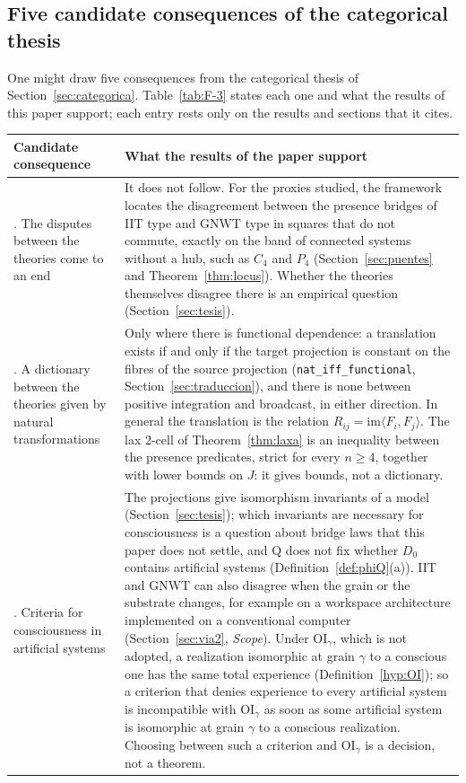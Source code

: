 \clearpage
\subsection{Five candidate consequences of the categorical thesis}\label{sec:consecuencias}
One might draw five consequences from the categorical thesis of Section~\ref{sec:categorica}. Table~\ref{tab:F-3} states each one and what the results of this paper support; each entry rests only on the results and sections that it cites.
\begin{table}[htbp]\centering\small
\begin{tabular}{>{\raggedright\arraybackslash}p{}>{\raggedright\arraybackslash}p{}}
\toprule
Candidate consequence & What the results of the paper support\\
\midrule
1. The disputes between the theories come to an end & It does not follow. For the proxies studied, the framework locates the disagreement between the presence bridges of IIT type and GNWT type in squares that do not commute, exactly on the band of connected systems without a hub, such as $C_4$ and $P_4$ (Section~\ref{sec:puentes} and Theorem~\ref{thm:locus}). Whether the theories themselves disagree there is an empirical question (Section~\ref{sec:tesis}).\\
2. A dictionary between the theories given by natural transformations & Only where there is functional dependence: a translation exists if and only if the target projection is constant on the fibres of the source projection (\texttt{nat\_iff\_functional}, Section~\ref{sec:traduccion}), and there is none between positive integration and broadcast, in either direction. In general the translation is the relation $R_{ij}=\mathrm{im}\langle F_i,F_j\rangle$. The lax 2-cell of Theorem~\ref{thm:laxa} is an inequality between the presence predicates, strict for every $n\ge4$, together with lower bounds on $J$: it gives bounds, not a dictionary.\\
3. Criteria for consciousness in artificial systems & The projections give isomorphism invariants of a model (Section~\ref{sec:tesis}); which invariants are necessary for consciousness is a question about bridge laws that this paper does not settle, and Q does not fix whether $D_0$ contains artificial systems (Definition~\ref{def:phiQ}(a)). IIT and GNWT can also disagree when the grain or the substrate changes, for example on a workspace architecture implemented on a conventional computer (Section~\ref{sec:via2}, \emph{Scope}). Under OI$_\gamma$, which is not adopted, a realization isomorphic at grain $\gamma$ to a conscious one has the same total experience (Definition~\ref{hyp:OI}); so a criterion that denies experience to every artificial system is incompatible with OI$_\gamma$ as soon as some artificial system is isomorphic at grain $\gamma$ to a conscious realization. Choosing between such a criterion and OI$_\gamma$ is a decision, not a theorem.\\

\end{tabular}
\end{table}
